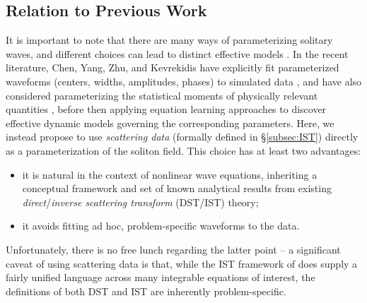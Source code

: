 \documentclass[journal=gmj]{CUP-JNL-DTM}%
\theoremstyle{definition}
\numberwithin{equation}{section}
\begin{document}
\subsection{Relation to Previous Work}\label{subsec:previous_work}
It is important to note that there are many ways of parameterizing solitary waves, and different choices can lead to distinct effective models \cite{Guo.etal2022PhysRevResearch, Zhang.etal2025ComputerMethodsinAppliedMechanicsandEngineering}. In the recent literature, Chen, Yang, Zhu, and Kevrekidis have explicitly fit parameterized waveforms (centers, widths, amplitudes, phases) to simulated data \cite{Yang.etal2025}, and have also considered parameterizing the statistical moments of physically relevant quantities \cite{Chen.etal2025ChaosInterdiscipJNonlinearSci, Yang.etal2024FrontPhotonics}, before then applying equation learning approaches to discover effective dynamic models governing the corresponding parameters. Here, we instead propose to use \textit{scattering data} (formally defined in \S\ref{subsec:IST}) directly as a parameterization of the soliton field. This choice has at least two advantages: \begin{itemize}
    \item it is natural in the context of nonlinear wave equations, inheriting a conceptual framework and set of known analytical results from existing \textit{direct}/\textit{inverse scattering transform} (DST/IST) theory;

    \smallskip
    
    \item it avoids fitting ad hoc, problem-specific waveforms to the data.
\end{itemize} Unfortunately, there is no free lunch regarding the latter point -- a significant caveat of using scattering data is that, while the IST framework of \cite{Ablowitz.etal1974StudApplMath} does supply a fairly unified language across many integrable equations of interest, the definitions of both DST and IST are inherently problem-specific.

\newpage
\end{document}

